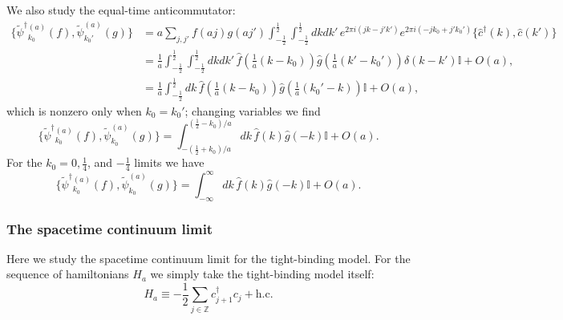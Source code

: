 \documentclass[prl,twocolumn,lengthcheck,superscriptaddress]{revtex4-1}
\theoremstyle{definition}
\theoremstyle{remark}
\begin{document}
We also study the equal-time anticommutator:
\begin{equation}
	\begin{split}
		\{ {\widetilde{\psi}^\dag}{}^{(a)}_{k_0}(f),\widetilde{\psi}^{(a)}_{k_0'}(g) \} &= a\sum_{j,j'}f(aj)g(aj')\int_{-\frac12}^{\frac12}\int_{-\frac12}^{\frac12} dkdk'\, e^{2\pi i (jk-j'k')}e^{2\pi i (-jk_0+j'k_0')} \{\widehat{c}^\dag(k),\widehat{c}(k')\} \\
		&= \frac{1}{a}\int_{-\frac12}^{\frac12}\int_{-\frac12}^{\frac12} dkdk'\, \widehat{f}(\tfrac1a (k-k_0))\widehat{g}(\tfrac1a (k'-k_0')) \delta(k-k') \mathbb{I} + O(a),\\
		&= \frac{1}{a}\int_{-\frac12}^{\frac12} dk\, \widehat{f}(\tfrac1a (k-k_0))\widehat{g}(\tfrac1a (k_0'-k)) \mathbb{I} + O(a),
	\end{split}
\end{equation}
which is nonzero only when $k_0=k_0'$; changing variables we find
\begin{equation}
	\{ {\widetilde{\psi}^\dag}{}^{(a)}_{k_0}(f),\widetilde{\psi}^{(a)}_{k_0}(g) \} 
	= \int_{-(\frac12+k_0)/a}^{(\frac12-k_0)/a} dk\, \widehat{f}(k)\widehat{g}(-k) \mathbb{I} + O(a).
\end{equation}
For the $k_0 = 0,\frac14$, and $-\frac14$ limits we have 
\begin{equation}
	\{ {\widetilde{\psi}^\dag}{}^{(a)}_{k_0}(f),\widetilde{\psi}^{(a)}_{k_0}(g) \} 
	= \int_{-\infty}^{\infty} dk\, \widehat{f}(k)\widehat{g}(-k) \mathbb{I} + O(a).
\end{equation}


\subsubsection{The spacetime continuum limit}
Here we study the spacetime continuum limit for the tight-binding model. For the sequence of hamiltonians $H_a$ we simply take the tight-binding model itself:
\begin{equation}
	H_a \equiv -\frac12 \sum_{j\in\mathbb{Z}} c_{j+1}^\dag c_j + \text{h.c.}
\end{equation}
\end{document}
